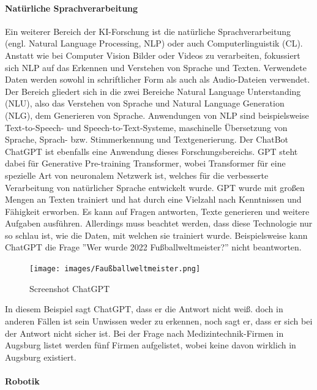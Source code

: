 \documentclass[a4paper,12pt, german]{report}
\begin{document}
\paragraph{Natürliche Sprachverarbeitung}
 
Ein weiterer Bereich der KI-Forschung ist die natürliche Sprachverarbeitung (engl. Natural Language Processing, NLP) oder auch Computerlinguistik (CL). Anstatt wie bei Computer Vision Bilder oder Videos zu verarbeiten, fokussiert sich NLP auf das Erkennen und Verstehen von Sprache und Texten. Verwendete Daten werden sowohl in schriftlicher Form als auch als Audio-Dateien verwendet. Der Bereich gliedert sich in die zwei Bereiche Natural Language Unterstanding (NLU), also das Verstehen von Sprache und Natural Language Generation (NLG), dem Generieren von Sprache. \newline
Anwendungen von NLP sind beispielsweise Text-to-Speech- und Speech-to-Text-Systeme, maschinelle Übersetzung von Sprache, Sprach- bzw. Stimmerkennung und Textgenerierung. 
Der ChatBot ChatGPT ist ebenfalls eine Anwendung dieses Forschungsbereichs. GPT steht dabei für Generative Pre-training Transformer, wobei Transformer für eine spezielle Art von neuronalem Netzwerk ist, welches für die verbesserte Verarbeitung von natürlicher Sprache entwickelt wurde. GPT wurde mit großen Mengen an Texten trainiert und hat durch eine Vielzahl nach Kenntnissen und Fähigkeit erworben. Es kann auf Fragen antworten, Texte generieren und weitere Aufgaben ausführen.\cite{04} 
Allerdings muss beachtet werden, dass diese Technologie nur so schlau ist, wie die Daten, mit welchen sie trainiert wurde. Beispielsweise kann ChatGPT die Frage ''Wer wurde 2022 Fußballweltmeister?'' nicht beantworten. 

\begin{figure}[H]
  \center
 \texttt{[image: images/Faußballweltmeister.png]}
  \caption[Screenshot ChatGPT]{Screenshot ChatGPT}
\end{figure}

In diesem Beispiel sagt ChatGPT, dass er die Antwort nicht weiß. doch in anderen Fällen ist sein Unwissen weder zu erkennen, noch sagt er, dass er sich bei der Antwort nicht sicher ist. Bei der Frage nach Medizintechnik-Firmen in Augsburg listet werden fünf Firmen aufgelistet, wobei keine davon wirklich in Augsburg existiert.

\paragraph{Robotik}
\end{document}
